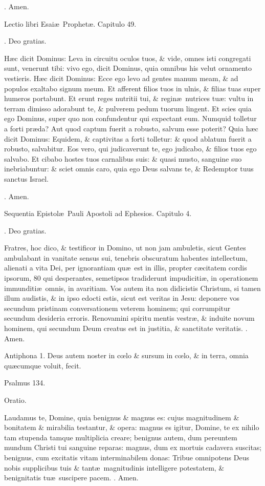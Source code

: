 \documentclass[letter,11pt]{book}
\makeatletter
\DeclareRobustCommand{\Rbar}{\vers@resp{0pt}{R}}
\newcommand{\vers@resp@sym}{\raisebox{0.2ex}{\rotatebox[origin=c]{-20}{$\m@th\rceil$}}}
\newcommand{\vers@resp}[2]{%
  {\ooalign{\hidewidth\kern#1\vers@resp@sym\hidewidth\cr#2\cr}}%
}%
\def\R{\color{Red} \Rbar . \color{black}}
\makeatother
\begin{document}
\begin{multicols*}{2}
\R Amen.

Lectio libri Esai\ae \ Prophet\ae . Capitulo 49.

\R Deo gratias.

H\ae c dicit Dominus: Leva in circuitu oculos tuos, \& vide, omnes isti congregati sunt, venerunt tibi: vivo ego, dicit Dominus, quia omnibus his velut ornamento vestieris. H\ae c dicit Dominus: Ecce ego levo ad gentes manum meam, \& ad populos exaltabo signum meum. Et afferent filios tuos in ulnis, \& filias tuas super humeros portabunt. Et erunt reges nutritii tui, \& regin\ae \ nutrices tu\ae : vultu in terram dimisso adorabunt te, \& pulverem pedum tuorum lingent. Et scies quia ego Dominus, super quo non confundentur qui expectant eum. Numquid tolletur a forti pr\ae da? Aut quod captum fuerit a robusto, salvum esse poterit? Quia h\ae c dicit Dominus: Equidem, \& captivitas a forti tolletur: \& quod ablatum fuerit a robusto, salvabitur. Eos vero, qui judicaverunt te, ego judicabo, \& filios tuos ego salvabo. Et cibabo hostes tuos carnalibus suis: \& quasi musto, sanguine suo inebriabuntur: \& sciet omnis caro, quia ego Deus salvans te, \& Redemptor tuus sanctus Israel.

\R Amen.

Sequentia Epistol\ae \ Pauli Apostoli ad Ephesios. Capitulo 4.

\R Deo gratias.

Fratres, hoc dico, \& testificor in Domino, ut non jam ambuletis, sicut Gentes ambulabant in vanitate sensus sui, tenebris obscuratum habentes intellectum, alienati a vita Dei, per ignorantiam qu\ae \ est in illis, propter c\ae citatem cordis ipsorum, 80 qui desperantes, semetipsos tradiderunt impudiciti\ae , in operationem immunditi\ae \ omnis, in avaritiam. Vos autem ita non didicistis Christum, si tamen illum audistis, \& in ipso edocti estis, sicut est veritas in Jesu: deponere vos secundum pristinam conversationem veterem hominem; qui corrumpitur secundum desideria erroris. Renovamini spiritu mentis vestr\ae , \& induite novum hominem, qui secundum Deum creatus est in justitia, \& sanctitate veritatis. \R Amen.

Antiphona 1. Deus autem noster in c\oe lo \& sursum in c\oe lo, \& in terra, omnia qu\ae cumque voluit, fecit.

Psalmus 134.

Oratio.

Laudamus te, Domine, quia benignus \& magnus es: cujus magnitudinem \& bonitatem \& mirabilia testantur, \& opera: magnus es igitur, Domine, te ex nihilo tam stupenda tamque multiplicia creare; benignus autem, dum pereuntem mundum Christi tui sanguine reparas: magnus, dum ex mortuis cadavera suscitas; benignus, cum excitatis vitam interminabilem donas: Tribue omnipotens Deus nobis supplicibus tuis \& tant\ae \ magnitudinis intelligere potestatem, \& benignitatis tu\ae \ suscipere pacem.
\R Amen.


\end{multicols*}
\end{document}
